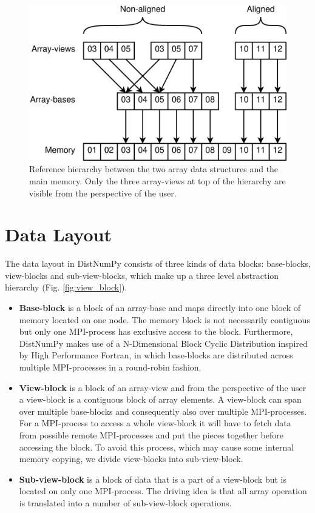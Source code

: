 \documentclass[preprint]{../PGAS10/sigplanconf}
\begin{document}
\begin{figure}
 \centering
 \includegraphics[width=\linewidth]{gfx/views}
 \caption{Reference hierarchy between the two array data structures and the main memory. Only the three array-views at top of the hierarchy are visible from the perspective of the user.}
 \label{fig:views}
\end{figure}

\section{Data Layout}
The data layout in DistNumPy consists of three kinds of data blocks: base-blocks, view-blocks and sub-view-blocks, which make up a three level abstraction hierarchy (Fig. \ref{fig:view_block}).

\begin{itemize}
\item \textbf{Base-block} is a block of an array-base and maps directly into one block of memory located on one node. The memory block is not necessarily contiguous but only one MPI-process has exclusive access to the block. Furthermore, DistNumPy makes use of a N-Dimensional Block Cyclic Distribution inspired by High Performance Fortran\cite{Loveman93}, in which base-blocks are distributed across multiple MPI-processes in a round-robin fashion.


\item \textbf{View-block} is a block of an array-view and from the perspective of the user a view-block is a contiguous block of array elements. A view-block can span over multiple base-blocks and consequently also over multiple MPI-processes. For a MPI-process to access a whole view-block it will have to fetch data from possible remote MPI-processes and put the pieces together before accessing the block. To avoid this process, which may cause some internal memory copying, we divide view-blocks into sub-view-block.

\item \textbf{Sub-view-block} is a block of data that is a part of a view-block but is located on only one MPI-process. The driving idea is that all array operation is translated into a number of sub-view-block operations.

\end{itemize}
\end{document}
